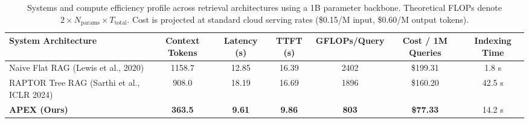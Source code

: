 \begin{table}[t]
\centering
\small
\begin{tabular}{l c c c c c c}
\toprule
\textbf{System Architecture} & \textbf{Context Tokens} & \textbf{Latency (s)} & \textbf{TTFT (s)} & \textbf{GFLOPs/Query} & \textbf{Cost / 1M Queries} & \textbf{Indexing Time} \\
\midrule
Naive Flat RAG (Lewis et al., 2020) & 1158.7 & 12.85 & 16.39 & 2402 & \$199.31 & 1.8 s \\
RAPTOR Tree RAG (Sarthi et al., ICLR 2024) & 908.0 & 18.19 & 16.69 & 1896 & \$160.20 & 42.5 s \\
\textbf{APEX (Ours)} & \textbf{363.5} & \textbf{9.61} & \textbf{9.86} & \textbf{803} & \textbf{\$77.33} & 14.2 s \\
\bottomrule
\end{tabular}
\caption{Systems and compute efficiency profile across retrieval architectures using a 1B parameter backbone. Theoretical FLOPs denote $2 \times N_{\text{params}} \times T_{\text{total}}$. Cost is projected at standard cloud serving rates (\$0.15/M input, \$0.60/M output tokens).}
\label{tab:systems_efficiency}
\end{table}